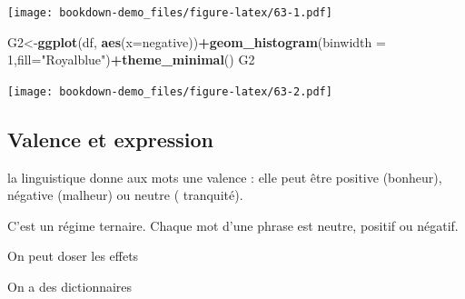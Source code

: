 \documentclass[
]{book}
\newenvironment{Shaded}{\begin{snugshade}}{\end{snugshade}}
\newcommand{\DataTypeTok}[1]{\textcolor[rgb]{0.13,0.29,0.53}{#1}}
\newcommand{\DecValTok}[1]{\textcolor[rgb]{0.00,0.00,0.81}{#1}}
\newcommand{\KeywordTok}[1]{\textcolor[rgb]{0.13,0.29,0.53}{\textbf{#1}}}
\newcommand{\NormalTok}[1]{#1}
\newcommand{\OperatorTok}[1]{\textcolor[rgb]{0.81,0.36,0.00}{\textbf{#1}}}
\newcommand{\StringTok}[1]{\textcolor[rgb]{0.31,0.60,0.02}{#1}}
\begin{document}
\texttt{[image: bookdown-demo\_files/figure-latex/63-1.pdf]}

\begin{Shaded}
\begin{Highlighting}[]
\NormalTok{G2<-}\KeywordTok{ggplot}\NormalTok{(df, }\KeywordTok{aes}\NormalTok{(}\DataTypeTok{x=}\NormalTok{negative))}\OperatorTok{+}\KeywordTok{geom_histogram}\NormalTok{(}\DataTypeTok{binwidth =} \DecValTok{1}\NormalTok{,}\DataTypeTok{fill=}\StringTok{"Royalblue"}\NormalTok{)}\OperatorTok{+}\KeywordTok{theme_minimal}\NormalTok{()}
\NormalTok{G2}
\end{Highlighting}
\end{Shaded}

\texttt{[image: bookdown-demo\_files/figure-latex/63-2.pdf]}

\hypertarget{valence-et-expression}{%
\subsection{Valence et expression}\label{valence-et-expression}}

la linguistique donne aux mots une valence : elle peut être positive (bonheur), négative (malheur) ou neutre ( tranquité).

C'est un régime ternaire. Chaque mot d'une phrase est neutre, positif ou négatif.

On peut doser les effets

On a des dictionnaires
\end{document}
